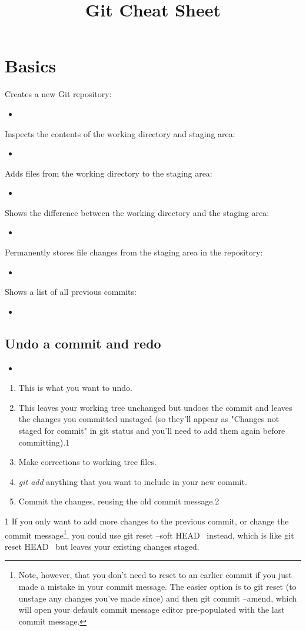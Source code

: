\documentclass[a4paper, twocolumn]{article}
\title{Git Cheat Sheet}
\newcommand{\insertshellcode}[2]{\begin{itemize}\item[]\end{itemize}} %
\begin{document}
\maketitle
\section{Basics}
Creates a new Git repository:
\insertshellcode{Scripts/basics/git_init.txt}{} %
%
Inspects the contents of the working directory and staging area:
\insertshellcode{Scripts/basics/git_status.txt}{}
%
Adds files from the working directory to the staging area:
\insertshellcode{Scripts/basics/git_add.txt}{}
%
Shows the difference between the working directory and the staging area:
\insertshellcode{Scripts/basics/git_diff.txt}{}
%
Permanently stores file changes from the staging area in the repository:
\insertshellcode{Scripts/basics/git_commit.txt}{}
%
Shows a list of all previous commits:
\insertshellcode{Scripts/basics/git_log.txt}{}

\subsection{Undo a commit and redo}
\insertshellcode{Scripts/basics/git_undo.txt}{}
\begin{enumerate}
	\item This is what you want to undo.
	\item This leaves your working tree unchanged but undoes the commit and leaves the changes you committed unstaged (so they'll appear as "Changes not staged for commit" in git status and you'll need to add them again before committing).1
	\item Make corrections to working tree files.
	\item \emph{git add} anything that you want to include in your new commit.
	\item Commit the changes, reusing the old commit message.2
\end{enumerate}
1 If you only want to add more changes to the previous commit, or change the commit message\footnote{Note, however, that you don't need to reset to an earlier commit if you just made a mistake in your commit message. The easier option is to git reset (to unstage any changes you've made since) and then git commit --amend, which will open your default commit message editor pre-populated with the last commit message.}, you could use git reset --soft HEAD~ instead, which is like git reset HEAD~ but leaves your existing changes staged.
\end{document}
